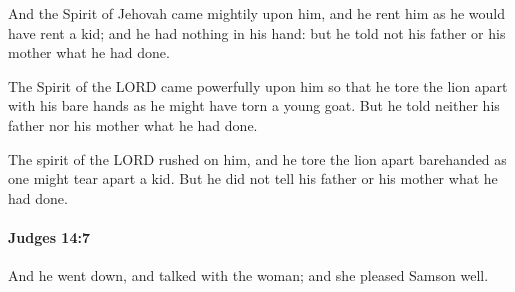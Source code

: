 			\begin{versebox}
					\item[BHS] 
					\item[ASV] And the Spirit of Jehovah came mightily upon him, and he rent him as he would have rent a kid; and he had nothing in his hand: but he told not his father or his mother what he had done.
					\item[NIV] The Spirit of the LORD came powerfully upon him so that he tore the lion apart with his bare hands as he might have torn a young goat. But he told neither his father nor his mother what he had done.
					\item[NRSV] The spirit of the LORD rushed on him, and he tore the lion apart barehanded as one might tear apart a kid. But he did not tell his father or his mother what he had done.
			\end{versebox}

		\paragraph{Judges 14:7} %
			\label{JUDGES-14-7}

			And he went down, and talked with the woman; and she pleased Samson well.

